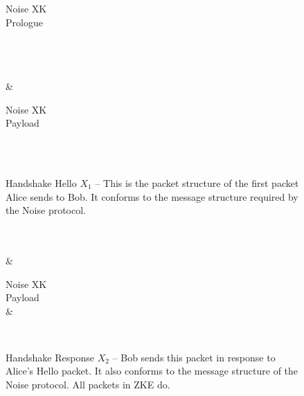 \documentclass{article}
\begin{document}
\begin{figure}[!ht]
	\caption{Handshake Hello $X_1$ -- This is the packet structure of the first packet Alice sends to Bob. It conforms to the message structure required by the Noise protocol.}\label{packet:handshake_hello}
	\centering
	\begin{bytefield}[bitwidth=5.5em]{4}
		\begin{rightwordgroup}{Noise XK\\Prologue}
		\end{rightwordgroup} \\
		 \\
		 \\
		 &  \\
		\begin{rightwordgroup}{Noise XK\\Payload}
			 \\
			 \\
		\end{rightwordgroup} \\
	\end{bytefield}
\end{figure}

\begin{figure}[!ht]
	\caption{Handshake Response $X_2$ -- Bob sends this packet in response to Alice's Hello packet. It also conforms to the message structure of the Noise protocol. All packets in ZKE do.}\label{packet:handshake_response}
	\centering
	\begin{bytefield}[bitwidth=5.5em]{4}
		 \\
		 \\
		 &  \\
		\begin{rightwordgroup}{Noise XK\\Payload}
			 \\
			 & 
		\end{rightwordgroup} \\
	\end{bytefield}
\end{figure}
\end{document}
